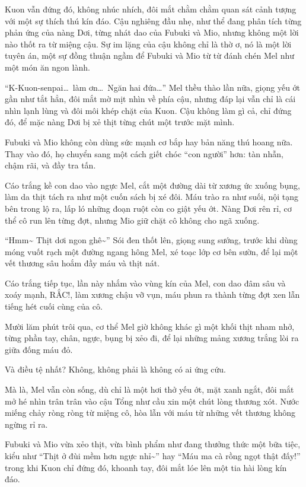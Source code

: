 \documentclass[../main.tex]{subfiles}
\begin{document}
Kuon vẫn đứng đó, không nhúc nhích, đôi mắt chằm chằm quan sát cảnh tượng với một sự thích thú kín đáo. Cậu nghiêng đầu nhẹ, như thể đang phân tích từng phản ứng của nàng Dơi, từng nhát dao của Fubuki và Mio, nhưng không một lời nào thốt ra từ miệng cậu. Sự im lặng của cậu không chỉ là thờ ơ, nó là một lời tuyên án, một sự đồng thuận ngầm để Fubuki và Mio từ từ đánh chén Mel như một món ăn ngon lành.

``K-Kuon-senpai\dots\ làm ơn\dots\ Ngăn hai đứa\dots'' Mel thều thào lần nữa, giọng yếu ớt gần như tắt hẳn, đôi mắt mờ mịt nhìn về phía cậu, nhưng đáp lại vẫn chỉ là cái nhìn lạnh lùng và đôi môi khép chặt của Kuon. Cậu không làm gì cả, chỉ đứng đó, để mặc nàng Dơi bị xẻ thịt từng chút một trước mặt mình.

Fubuki và Mio không còn dùng sức mạnh cơ bắp hay bản năng thú hoang nữa. Thay vào đó, họ chuyển sang một cách giết chóc ``con người'' hơn: tàn nhẫn, chậm rãi, và đầy tra tấn.

Cáo trắng kề con dao vào ngực Mel, cắt một đường dài từ xương ức xuống bụng, làm da thịt tách ra như một cuốn sách bị xé đôi. Máu trào ra như suối, nội tạng bên trong lộ ra, lấp ló những đoạn ruột còn co giật yếu ớt. Nàng Dơi rên rỉ, cơ thể cô run lên từng đợt, nhưng Mio giữ chặt cô không cho ngã xuống.

``Hmm\~{} Thịt dơi ngon ghê\~{}'' Sói đen thốt lên, giọng sung sướng, trước khi dùng móng vuốt rạch một đường ngang hông Mel, xé toạc lớp cơ bên sườn, để lại một vết thương sâu hoắm đầy máu và thịt nát.

Cáo trắng tiếp tục, lần này nhắm vào vùng kín của Mel, con dao đâm sâu và xoáy mạnh, RẮC!, làm xương chậu vỡ vụn, máu phun ra thành từng đợt xen lẫn tiếng hét cuối cùng của cô.

Mười lăm phút trôi qua, cơ thể Mel giờ không khác gì một khối thịt nham nhở, từng phần tay, chân, ngực, bụng bị xẻo đi, để lại những mảng xương trắng lòi ra giữa đống máu đỏ.

Và điều tệ nhất? Không, không phải là không có ai ứng cứu.

Mà là, Mel vẫn còn sống, dù chỉ là một hơi thở yếu ớt, mặt xanh ngắt, đôi mắt mở hé nhìn trân trân vào cậu Tổng như cầu xin một chút lòng thương xót. Nước miếng chảy ròng ròng từ miệng cô, hòa lẫn với máu từ những vết thương không ngừng rỉ ra.

Fubuki và Mio vừa xẻo thịt, vừa bình phẩm như đang thưởng thức một bữa tiệc, kiểu như ``Thịt ở đùi mềm hơn ngực nhỉ\~{}'' hay ``Máu ma cà rồng ngọt thật đấy!'' trong khi Kuon chỉ đứng đó, khoanh tay, đôi mắt lóe lên một tia hài lòng kín đáo.
\end{document}
